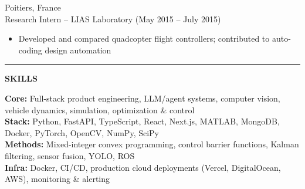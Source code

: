 \documentclass[10pt,letterpaper]{article}
\newlength{\sectionspaceabove}    \setlength{\sectionspaceabove}{8pt}   %
\newlength{\sectionlinetotitlegap}    \setlength{\sectionlinetotitlegap}{0pt}   %
\newlength{\sectiontitletocontentgap} \setlength{\sectiontitletocontentgap}{-8pt}  %
\newlength{\entrygap}             \setlength{\entrygap}{6pt}
\newlength{\titlesubtitlegap}     \setlength{\titlesubtitlegap}{1pt}
\newlength{\subtitlebulletgap}    \setlength{\subtitlebulletgap}{1pt}
\newlength{\bulletgap}            \setlength{\bulletgap}{1pt}
\newcommand{\sectionfontsize}{\fontsize{10pt}{10pt}\selectfont}
\newcommand{\entrytitlesize}{\fontsize{10pt}{12pt}\selectfont}
\newcommand{\subtitlesize}{\fontsize{10pt}{12pt}\selectfont}
\newcommand{\ressection}[1]{%
  \vspace{\sectionspaceabove}%
  \hrule
  \vspace{\sectionlinetotitlegap}%
  \begin{center}{\sectionfontsize\textbf{#1}}\end{center}%
  \vspace{\sectiontitletocontentgap}%
}
\newcommand{\entry}[4]{%
  \vspace{\entrygap}%
  \noindent{\entrytitlesize\textbf{#1}} \hfill #2 \\[\titlesubtitlegap]%
  {\subtitlesize #3} \hfill (#4)%
  \vspace{\subtitlebulletgap}%
}
\begin{document}
\entry{ISAE-ENSMA}{Poitiers, France}
{Research Intern -- LIAS Laboratory}{May 2015 -- July 2015}
\begin{itemize}
  \item Developed and compared quadcopter flight controllers; contributed to auto-coding design automation
\end{itemize}

\ressection{SKILLS}

\noindent\textbf{Core:} Full-stack product engineering, LLM/agent systems, computer vision, vehicle dynamics, simulation, optimization \& control \\
\textbf{Stack:} Python, FastAPI, TypeScript, React, Next.js, MATLAB, MongoDB, Docker, PyTorch, OpenCV, NumPy, SciPy \\
\textbf{Methods:} Mixed-integer convex programming, control barrier functions, Kalman filtering, sensor fusion, YOLO, ROS \\
\textbf{Infra:} Docker, CI/CD, production cloud deployments (Vercel, DigitalOcean, AWS), monitoring \& alerting
\end{document}
